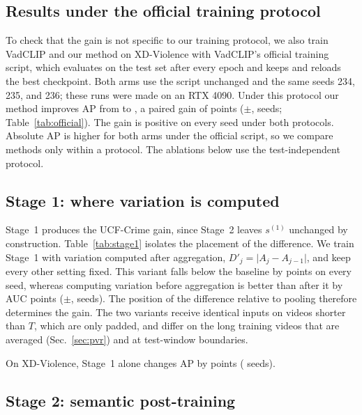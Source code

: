 \subsection{Results under the official training protocol}
\label{sec:official}



To check that the gain is not specific to our training protocol, we also train VadCLIP and our method on XD-Violence with VadCLIP's official training script, which evaluates on the test set after every epoch and keeps and reloads the best checkpoint. Both arms use the script unchanged and the same seeds 234, 235, and 236; these runs were made on an RTX 4090. Under this protocol our method improves AP from \offBase{} to \offOurs{}, a paired gain of \offGainMean{} points ($\pm$\offGainSd, \offGainPos{} seeds; Table~\ref{tab:official}). The gain is positive on every seed under both protocols. Absolute AP is higher for both arms under the official script, so we compare methods only within a protocol. The ablations below use the test-independent protocol.

\subsection{Stage 1: where variation is computed}
\label{sec:ablation}



Stage~1 produces the UCF-Crime gain, since Stage~2 leaves $s^{(1)}$ unchanged by construction. Table~\ref{tab:stage1} isolates the placement of the difference. We train Stage~1 with variation computed after aggregation, $D'_j = \lvert A_j - A_{j-1} \rvert$, and keep every other setting fixed. This variant falls below the baseline by \postBaseMean{} points on every seed, whereas computing variation before aggregation is better than after it by \prePostMean{} AUC points ($\pm$\prePostSd, \prePostPos{} seeds). The position of the difference relative to pooling therefore determines the gain. The two variants receive identical inputs on videos shorter than $T$, which are only padded, and differ on the long training videos that are averaged (Sec.~\ref{sec:pvr}) and at test-window boundaries.

On XD-Violence, Stage~1 alone changes AP by \xdStageOneMean{} points (\xdStageOnePos{} seeds).
\subsection{Stage 2: semantic post-training}
\label{sec:stage2}

